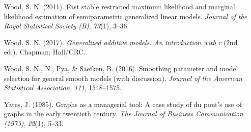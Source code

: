 \documentclass[print]{nuthesis}
\newlength{\cslhangindent}
\newenvironment{CSLReferences}%
{\setlength{\parindent}{0pt}%
\everypar{\setlength{\hangindent}{\cslhangindent}}\ignorespaces}%
{\par}
\begin{document}
\begin{CSLReferences}{1}{0}
\leavevmode\hypertarget{ref-mgcv1}{}%
Wood, S. N. (2011). Fast stable restricted maximum likelihood and marginal likelihood estimation of semiparametric generalized linear models. \emph{Journal of the Royal Statistical Society (B)}, \emph{73}(1), 3--36.

\leavevmode\hypertarget{ref-mgcv4}{}%
Wood, S. N. (2017). \emph{Generalized additive models: An introduction with r} (2nd ed.). Chapman; Hall/CRC.

\leavevmode\hypertarget{ref-mgcv2}{}%
Wood, S. N., N., Pya, \& Saefken, B. (2016). Smoothing parameter and model selection for general smooth models (with discussion). \emph{Journal of the American Statistical Association}, \emph{111}, 1548--1575.

\leavevmode\hypertarget{ref-yates1985graphs}{}%
Yates, J. (1985). Graphs as a managerial tool: A case study of du pont's use of graphs in the early twentieth century. \emph{The Journal of Business Communication (1973)}, \emph{22}(1), 5--33.

\end{CSLReferences}


\backmatter

% 






\end{document}
